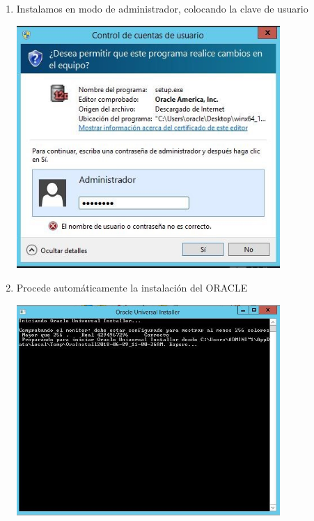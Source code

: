 \begin{enumerate}[1.]
	\hfill \break
	\item Instalamos en modo de administrador, colocando la clave de usuario\\
	\begin{center}
	\includegraphics[width=10cm]{./Imagenes/img10} 
	\end{center}

	\item Procede autom\'aticamente la instalaci\'on del ORACLE\\
	\begin{center}
	\includegraphics[width=10cm]{./Imagenes/img11} 
	\end{center}


\end{enumerate}
